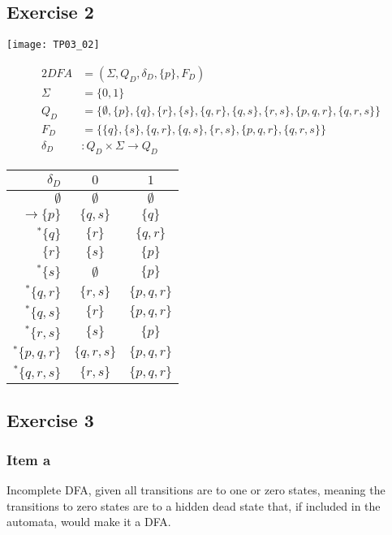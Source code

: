 {\subsection{Exercise 2}
\label{subsec:03_02}
\begin{center} \texttt{[image: TP03\_02]} \end{center}
\begin{alignat*}{2}
	DFA       &= (\Sigma, Q_D, \delta_D, \{p\}, F_D)\\
	\Sigma    &= \{0,1\}\\
	Q_D       &= \{\emptyset,\{p\},\{q\},\{r\},\{s\},\{q,r\},\{q,s\},\{r,s\},\{p,q,r\},\{q,r,s\}\}\\
	F_D       &= \{\{q\},\{s\},\{q,r\},\{q,s\},\{r,s\},\{p,q,r\},\{q,r,s\}\}\\
	\delta_D &\colon Q_D \times \Sigma \rightarrow Q_D
\end{alignat*}
\begin{center}
\begin{tabular}{ r | c c }
 $\delta_D$ & $0$ & $1$ \\
 \hline
 $\emptyset              $ & $\emptyset  $ & $\emptyset  $ \\
 $\rightarrow \{p      \}$ & $\{  q,  s\}$ & $\{  q    \}$ \\  
 $^\ast       \{  q    \}$ & $\{    r  \}$ & $\{  q,r  \}$ \\
 $            \{    r  \}$ & $\{      s\}$ & $\{p      \}$ \\
 $^\ast       \{      s\}$ & $\emptyset  $ & $\{p      \}$ \\
 $^\ast       \{  q,r  \}$ & $\{    r,s\}$ & $\{p,q,r  \}$ \\
 $^\ast       \{  q,  s\}$ & $\{    r  \}$ & $\{p,q,r  \}$ \\
 $^\ast       \{    r,s\}$ & $\{      s\}$ & $\{p      \}$ \\
 $^\ast       \{p,q,r  \}$ & $\{  q,r,s\}$ & $\{p,q,r  \}$ \\
 $^\ast       \{  q,r,s\}$ & $\{    r,s\}$ & $\{p,q,r  \}$
\end{tabular}
\end{center}
\pagebreak
\subsection{Exercise 3} \label{subsec:03_03}
\subsubsection{Item a}
Incomplete DFA, given all transitions are to one or zero states, meaning the transitions to zero states are to a hidden dead state that, if included in the automata, would make it a DFA.
}

